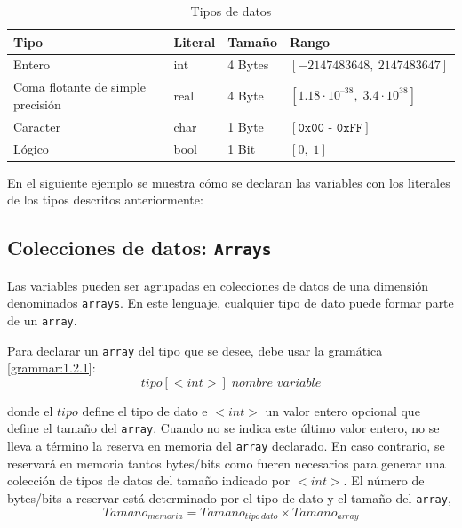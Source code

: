 \documentclass[11pt, english]{article}
\begin{document}
	\begin{table}[H]
		\begin{center}
			\caption{Tipos de datos}
			\label{tab:table1}
			\begin{tabular}{l|l|l|l}
				\toprule
				\textbf{Tipo} & \textbf{Literal} & \textbf{Tamaño} & \textbf{Rango}\\
				\midrule
				Entero & int & 4 Bytes & $\left [-2147483648,\: 2147483647 \right]$\\
				Coma flotante de simple precisión & real & 4 Byte & $\left [ 1.18 \cdot 10^{–38},\; 3.4 \cdot 10^{38} \right ]$\\
				Caracter & char & 1 Byte & $\left [ \texttt{0x00 - 0xFF} \right ]$\\
				Lógico & bool & 1 Bit & $\left [0,\; 1 \right ]$\\
				\bottomrule
			\end{tabular}
		\end{center}
	\end{table}
	
	En el siguiente ejemplo se muestra cómo se declaran las variables con los literales de los tipos descritos anteriormente:
	
	
	
	\subsection{Colecciones de datos: \texttt{Arrays}}\label{arrays}
	Las variables pueden ser agrupadas en colecciones de datos de una dimensión denominados \texttt{arrays}. En este lenguaje, cualquier tipo de dato puede formar parte de un \texttt{array}.
	
	Para declarar un \texttt{array} del tipo que se desee, debe usar la gramática \ref{grammar:1.2.1}:
	\begin{equation}\label{grammar:1.2.1}
	tipo[<int>]\; nombre\_variable
	\end{equation}
	
	donde el $tipo$ define el tipo de dato e $<int>$ un valor entero opcional que define el tamaño del \texttt{array}. Cuando no se indica este último valor entero, no se lleva a término la reserva en memoria del \texttt{array} declarado. En caso contrario, se reservará en memoria tantos bytes/bits como fueren necesarios para generar una colección de tipos de datos del tamaño indicado por $<int>$. El número de bytes/bits a reservar está determinado por el tipo de dato y el tamaño del \texttt{array},
	\begin{equation}\label{eq:1.2}
	Tamano_{memoria} = Tamano_{tipo\, dato} \times Tamano_{array}
	\end{equation}
	
\end{document}
